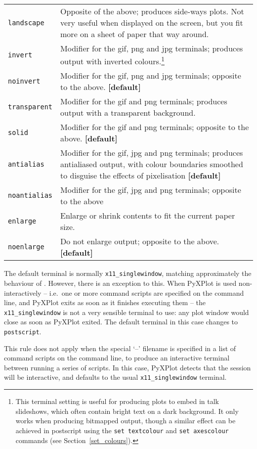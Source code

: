 \begin{longtable}{p{3cm}p{9cm}}
{\tt landscape} & Opposite of the above; produces side-ways plots. Not very useful when displayed on the screen, but you fit more on a sheet of paper that way around.\index{landscape orientation}\\
{\tt invert} & Modifier for the gif, png and jpg terminals; produces output with inverted colours.\footnote{This terminal setting is useful for producing plots to embed in talk slideshows, which often contain bright text on a dark background. It only works when producing bitmapped output, though a similar effect can be achieved in postscript using the {\tt set textcolour} and {\tt set axescolour} commands (see Section~\ref{set_colours}).}\index{colours!inverting}\\
{\tt noinvert} & Modifier for the gif, png and jpg terminals; opposite to the above. {\bf [default]}\\
{\tt transparent} & Modifier for the gif and png terminals; produces output with a transparent background.\index{transparent terminal}\index{gif output!transparency}\index{png output!transparency}\\
{\tt solid} & Modifier for the gif and png terminals; opposite to the above. {\bf [default]}\\
{\tt antialias} & Modifier for the gif, jpg and png terminals; produces antialiased output, with colour boundaries smoothed to disguise the effects of pixelisation {\bf [default]}\\
{\tt noantialias} & Modifier for the gif, jpg and png terminals; opposite to the
above\\
{\tt enlarge} & Enlarge or shrink contents to fit the current paper
size.\index{enlarging output}\\
{\tt noenlarge} & Do not enlarge output; opposite to the above. {\bf [default]}\\
\end{longtable}
\label{terminals}

The default terminal is normally {\tt x11\_singlewindow}, matching
approximately the behaviour of \gnuplot. However, there is an exception to this.
When PyXPlot is used non-interactively -- i.e.\ one or more command scripts are
specified on the command line, and PyXPlot exits as soon as it finishes
executing them -- the {\tt x11\_singlewindow} is not a very sensible
terminal to use: any plot window would close as soon as PyXPlot exited. The
default terminal in this case changes to {\tt postscript}.

This rule does not apply when the special `--' filename is specified in a list
of command scripts on the command line, to produce an interactive terminal
between running a series of scripts. In this case, PyXPlot detects that the
session will be interactive, and defaults to the usual
{\tt x11\_singlewindow} terminal.

